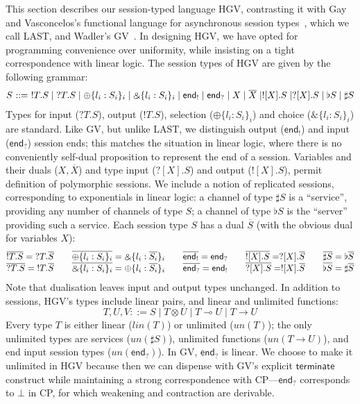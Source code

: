 \documentclass{easychair}
\makeatletter
\newcommand{\ba}{\begin{array}}
\newcommand{\ea}{\end{array}}
\newcommand{\bl}{\ba{@{}c@{}}}
\newcommand{\el}{\ea}
\newenvironment{equations}{\[\ba{@{}r@{~}c@{~}l@{}}}{\ea\]}
\newcommand{\key}{\mathsf}
\newcommand{\set}[1]{\{ #1 \}}
\newcommand{\row}[2]{\set{#1}_{#2}}
\newcommand{\gvOutput}[2]{\mathord{!}{#1}.{#2}}
\newcommand{\gvInput}[2]{\mathord{?}{#1}.{#2}}
\newcommand{\gvEndOutput}{\key{end}_!}
\newcommand{\gvEndInput}{\key{end}_?}
\newcommand{\gvPlus}[2]{\oplus \row{#1}{#2}}
\newcommand{\gvChoice}[2]{\binampersand \row{#1}{#2}}
\newcommand{\gvServer}[1]{\flat {#1}}
\newcommand{\gvService}[1]{\sharp {#1}}
\newcommand{\gvDual}[1]{\overline{#1}}
\newcommand{\gvOutputType}[2]{![{#1}].{#2}}
\newcommand{\gvInputType}[2]{?[{#1}].{#2}}
\newcommand{\la}{l}
\newcommand{\lolli}{\multimap}
\newcommand{\gvLinFun}[2]{{#1} \lolli {#2}}
\newcommand{\gvUnFun}[2]{{#1} \to {#2}}
\newcommand{\gvTimes}[2]{{#1} \otimes {#2}}
\newcommand{\cpBottom}{\bot}
\newcommand{\un}[1]{\mathit{un}(#1)}
\newcommand{\lin}[1]{\mathit{lin}(#1)}
\newcommand{\last}{LAST\xspace}
\newcommand{\hgv}{HGV\xspace}
\makeatother
\begin{document}
This section describes our session-typed language \hgv, contrasting it with Gay and Vasconcelos's
functional language for asynchronous session types~\cite{GayVasconcelos10}, which we call \last, and
Wadler's GV~\cite{Wadler12}.  In designing \hgv, we have opted for programming convenience over
uniformity, while insisting on a tight correspondence with linear logic.
%
The session types of \hgv are given by the following grammar:
\begin{equations}
  S & ::= & \gvOutput{T}{S} \mid \gvInput{T}{S} \mid
           \gvPlus{\la_i:S_i}{i} \mid \gvChoice{\la_i:S_i}{i} \mid
           \gvEndOutput \mid \gvEndInput
    \mid X \mid \gvDual{X} \mid
            \gvOutputType{X}{S} \mid \gvInputType{X}{S} \mid
            \gvServer{S} \mid \gvService{S}
\end{equations}%
Types for input ($\gvInput{T}{S}$), output ($\gvOutput{T}{S}$), selection ($\gvPlus{\la_i:S_i}{i}$)
and choice ($\gvChoice{\la_i:S_i}{i}$) are standard. Like GV, but unlike \last, we distinguish
output ($\gvEndOutput$) and input ($\gvEndInput$) session ends; this matches the situation in linear
logic, where there is no conveniently self-dual proposition to represent the end of a
session. Variables and their duals ($X,\gvDual{X}$) and type input ($\gvInputType{X}{S}$) and output
($\gvOutputType{X}{S}$), permit definition of polymorphic sessions. We include a notion of
replicated sessions, corresponding to exponentials in linear logic: a channel of type
$\gvService{S}$ is a ``service'', providing any number of channels of type $S$; a channel of type
$\gvServer{S}$ is the ``server'' providing such a service.
%
Each session type $S$ has a dual $\gvDual{S}$ (with the obvious dual for variables $X$):
\[
\bl
  \gvDual{\gvOutput{T}{S}} = \gvInput{T}{\gvDual{S}}
\qquad
  \gvDual{\gvPlus{\la_i:S_i}{i}} = \gvChoice{\la_i:\gvDual{S_i}}{i}
\qquad
  \gvDual{\gvEndOutput} = \gvEndInput
\qquad
  \gvDual{\gvOutputType{X}{S}} = \gvInputType{X}{\gvDual{S}}
\qquad
  \gvDual{\gvService{S}} = \gvServer{\gvDual{S}}
\\
  \gvDual{\gvInput{T}{S}} = \gvOutput{T}{\gvDual{S}}
\qquad
  \gvDual{\gvChoice{\la_i:S_i}{i}} = \gvPlus{\la_i:\gvDual{S_i}}{i}
\qquad
  \gvDual{\gvEndInput} = \gvEndOutput
\qquad
  \gvDual{\gvInputType{X}{S}} = \gvOutputType{X}{\gvDual{S}}
\qquad
  \gvDual{\gvServer{S}} = \gvService{\gvDual{S}}
\\
\el
\]
Note that dualisation leaves input and output types unchanged.  In addition to sessions, \hgv's
types include linear pairs, and linear and unlimited functions:
\[
T,U,V ::= S \mid \gvTimes{T}{U} \mid \gvLinFun{T}{U} \mid \gvUnFun{T}{U}
\]
%
Every type $T$ is either linear ($\lin{T}$) or unlimited ($\un{T}$); the only unlimited types are
services ($\un{\gvService{S}}$), unlimited functions ($\un{\gvUnFun{T}{U}}$), and end input session
types ($\un{\gvEndInput}$).
%
In GV, $\gvEndInput$ is linear. We choose to make it unlimited in \hgv because then we can dispense
with GV's explicit $\key{terminate}$ construct while maintaining a strong correspondence with
CP---$\gvEndInput$ corresponds to $\cpBottom$ in CP, for which weakening and contraction are
derivable.
\end{document}
